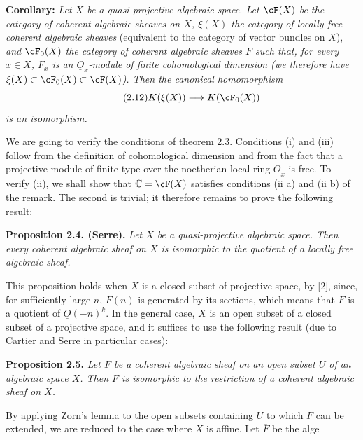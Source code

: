 \textbf{Corollary:}
\emph{Let $X$ be a quasi-projective algebraic space. Let $\cF(X)$ be the category of coherent algebraic sheaves on $X$, $\xi(X)$ the category of locally free coherent algebraic sheaves} (equivalent to the category of vector bundles on $X$), \emph{and $\cF_0(X)$ the category of coherent algebraic sheaves $F$ such that, for every $x\in X$, $F_x$ is an $\underline{O}_x$-module
%
of finite cohomological dimension (we therefore have $\xi(X)\subset\cF_0(X)\subset\cF(X)$). Then the canonical homomorphism}
\begin{equation}\tag{2.12}
 K(\xi(X))\longrightarrow K(\cF_0(X))
\end{equation}
\emph{is an isomorphism.}

We are going to verify the conditions of theorem 2.3. Conditions (i) and (iii) follow from the definition of cohomological dimension and from the fact that a projective module of finite type over the noetherian local ring $\underline{O}_x$ is free. To verify (ii), we shall show that $\mathbb{C}=\cF(X)$ satisfies conditions (ii a) and (ii b) of the remark. The second is trivial; it therefore remains to prove the following result:

\textbf{Proposition 2.4. (Serre).} \emph{Let $X$ be a quasi-projective algebraic space. Then every coherent algebraic sheaf on $X$ is isomorphic to the quotient of a locally free algebraic sheaf.}

This proposition holds when $X$ is a closed subset of projective space, by [2], since, for sufficiently large $n$, $F(n)$ is generated by its sections, which means that $F$ is a quotient of $\underline{O}(-n)^k$. In the general case, $X$ is an open subset of a closed subset of a projective space, and it suffices to use the following result (due to Cartier and Serre in particular cases):

\textbf{Proposition 2.5.} \emph{Let $F$ be a coherent algebraic sheaf on an open subset $U$ of an algebraic space $X$. Then $F$ is isomorphic to the restriction of a coherent algebraic sheaf on $X$.}

By applying Zorn's lemma to the open subsets containing $U$ to which $F$ can be extended, we are reduced to the case where $X$ is affine. Let $\overline F$ be the
alge%
